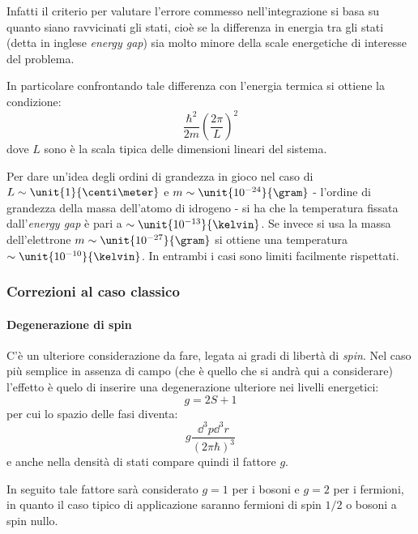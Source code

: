 Infatti il criterio per valutare l'errore commesso nell'integrazione si basa su quanto siano ravvicinati gli stati, cioè se la differenza in energia tra gli stati (detta in inglese \textit{energy gap}) sia molto minore della scale energetiche di interesse del problema.

In particolare confrontando tale differenza con l'energia termica si ottiene la condizione:
\begin{equation*}
	\frac{\hbar^2}{2m}\left(\frac{2\pi}{L}\right)^2
\end{equation*}
dove $L$ sono è la scala tipica delle dimensioni lineari del sistema.

\begin{es}
Per dare un'idea degli ordini di grandezza in gioco nel caso di $L \sim \unit{1}{\centi\meter}$ e $m \sim \unit{10^{-24}}{\gram}$ - l'ordine di grandezza della massa dell'atomo di idrogeno - si ha che la temperatura fissata dall'\textit{energy gap} è pari a $\sim \unit{10^{-13}}{\kelvin}$. Se invece si usa la massa dell'elettrone $m \sim \unit{10^{-27}}{\gram}$ si ottiene una temperatura $\sim \unit{10^{-10}}{\kelvin}$.
In entrambi i casi sono limiti facilmente rispettati.
\end{es}

\subsubsection{Correzioni al caso classico}

\paragraph{Degenerazione di spin} C'è un ulteriore considerazione da fare, legata ai gradi di libertà di \textit{spin}. Nel caso più semplice in assenza di campo (che è quello che si andrà qui a considerare) l'effetto è quelo di inserire una degenerazione ulteriore nei livelli energetici:
\begin{equation*}
g = 2S + 1
\end{equation*}
per cui lo spazio delle fasi diventa:
\begin{equation*}
g \frac{\dd ^3 p \dd ^3 r}{(2\pi \hbar)^3}
\end{equation*}
e anche nella densità di stati compare quindi il fattore $g$.

In seguito tale fattore sarà considerato $g=1$ per i bosoni e $g=2$ per i fermioni, in quanto il caso tipico di applicazione saranno fermioni di spin $1/2$ o bosoni a spin nullo.

